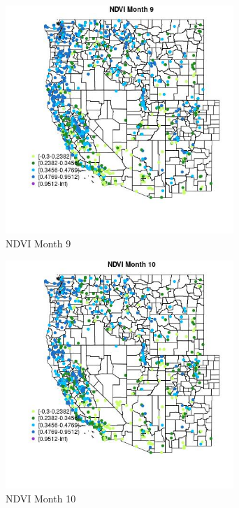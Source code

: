\begin{figure} 
\centering  
\includegraphics[width=0.77\textwidth]{Code_Outputs/Report_ML_input_PM25_Step4_part_f_de_duplicated_aveswNAs_MapObsMo9NDVI.jpg} 
\caption{\label{fig:Report_ML_input_PM25_Step4_part_f_de_duplicated_aveswNAsMapObsMo9NDVI}NDVI Month 9} 
\end{figure} 
 

\begin{figure} 
\centering  
\includegraphics[width=0.77\textwidth]{Code_Outputs/Report_ML_input_PM25_Step4_part_f_de_duplicated_aveswNAs_MapObsMo10NDVI.jpg} 
\caption{\label{fig:Report_ML_input_PM25_Step4_part_f_de_duplicated_aveswNAsMapObsMo10NDVI}NDVI Month 10} 
\end{figure} 
 


